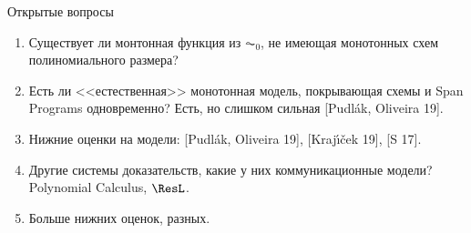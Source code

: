 \begin{frame}{Открытые вопросы}

    \begin{enumerate}
        \item Существует ли монтонная функция из $\AC_0$, не имеющая монотонных схем полиномиального
            размера?
            \pause
        \item Есть ли <<естественная>> монотонная модель, покрывающая схемы и Span Programs одновременно?
            Есть, но слишком сильная [Pudl\'{a}k, Oliveira 19].
            \pause
        \item Нижние оценки на модели: [Pudl\'{a}k, Oliveira 19], [Kraj\'{\i}\v{c}ek 19], [S 17].
            \pause
        \item Другие системы доказательств, какие у них коммуникационные модели? Polynomial Calculus,
            $\ResL$.
            \pause
        \item Больше нижних оценок, разных.
    \end{enumerate}
\end{frame}